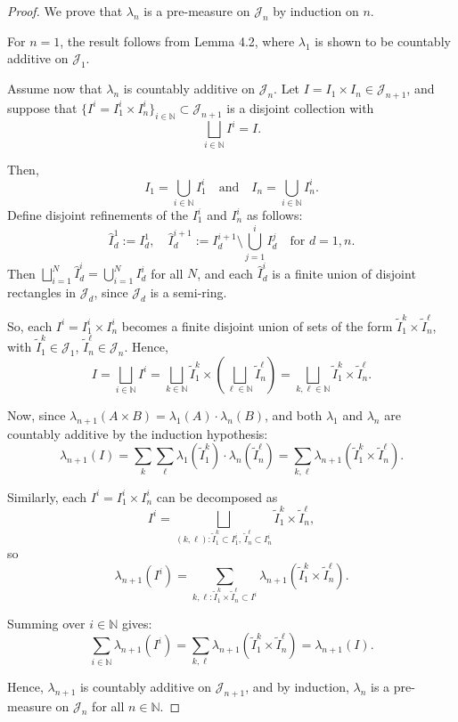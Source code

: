\documentclass[12pt]{article}
\theoremstyle{definition}
\begin{document}
\begin{proof}
We prove that \( \lambda_n \) is a pre-measure on \( \mathcal{J}_n \) by induction on \( n \).

For \( n = 1 \), the result follows from Lemma 4.2, where \( \lambda_1 \) is shown to be countably additive on \( \mathcal{J}_1 \).

Assume now that \( \lambda_n \) is countably additive on \( \mathcal{J}_n \). Let \( I = I_1 \times I_n \in \mathcal{J}_{n+1} \), and suppose that \( \{I^i = I_1^i \times I_n^i\}_{i \in \mathbb{N}} \subset \mathcal{J}_{n+1} \) is a disjoint collection with
\[
\bigsqcup_{i \in \mathbb{N}} I^i = I.
\]

Then,
\[
I_1 = \bigcup_{i \in \mathbb{N}} I_1^i \quad \text{and} \quad I_n = \bigcup_{i \in \mathbb{N}} I_n^i.
\]
Define disjoint refinements of the \( I_1^i \) and \( I_n^i \) as follows:
\[
\widehat{I}_d^1 := I_d^1, \quad \widehat{I}_d^{i+1} := I_d^{i+1} \setminus \bigcup_{j=1}^{i} I_d^j \quad \text{for } d = 1, n.
\]
Then \( \bigsqcup_{i=1}^N \widehat{I}_d^i = \bigcup_{i=1}^N I_d^i \) for all \( N \), and each \( \widehat{I}_d^i \) is a finite union of disjoint rectangles in \( \mathcal{J}_d \), since \( \mathcal{J}_d \) is a semi-ring.

So, each \( I^i = I_1^i \times I_n^i \) becomes a finite disjoint union of sets of the form \( \widetilde{I}_1^k \times \widetilde{I}_n^\ell \), with \( \widetilde{I}_1^k \in \mathcal{J}_1 \), \( \widetilde{I}_n^\ell \in \mathcal{J}_n \). Hence,
\[
I = \bigsqcup_{i \in \mathbb{N}} I^i
= \bigsqcup_{k \in \mathbb{N}} \widetilde{I}_1^k \times \left( \bigsqcup_{\ell \in \mathbb{N}} \widetilde{I}_n^\ell \right)
= \bigsqcup_{k, \ell \in \mathbb{N}} \widetilde{I}_1^k \times \widetilde{I}_n^\ell.
\]

Now, since \( \lambda_{n+1}(A \times B) = \lambda_1(A) \cdot \lambda_n(B) \), and both \( \lambda_1 \) and \( \lambda_n \) are countably additive by the induction hypothesis:
\[
\lambda_{n+1}(I) = \sum_{k} \sum_{\ell} \lambda_1(\widetilde{I}_1^k) \cdot \lambda_n(\widetilde{I}_n^\ell)
= \sum_{k, \ell} \lambda_{n+1}(\widetilde{I}_1^k \times \widetilde{I}_n^\ell).
\]

Similarly, each \( I^i = I_1^i \times I_n^i \) can be decomposed as
\[
I^i = \bigsqcup_{(k, \ell): \widetilde{I}_1^k \subset I_1^i, \, \widetilde{I}_n^\ell \subset I_n^i} \widetilde{I}_1^k \times \widetilde{I}_n^\ell,
\]
so
\[
\lambda_{n+1}(I^i) = \sum_{k, \ell: \widetilde{I}_1^k \times \widetilde{I}_n^\ell \subset I^i} \lambda_{n+1}(\widetilde{I}_1^k \times \widetilde{I}_n^\ell).
\]

Summing over \( i \in \mathbb{N} \) gives:
\[
\sum_{i \in \mathbb{N}} \lambda_{n+1}(I^i)
= \sum_{k, \ell} \lambda_{n+1}(\widetilde{I}_1^k \times \widetilde{I}_n^\ell)
= \lambda_{n+1}(I).
\]

Hence, \( \lambda_{n+1} \) is countably additive on \( \mathcal{J}_{n+1} \), and by induction, \( \lambda_n \) is a pre-measure on \( \mathcal{J}_n \) for all \( n \in \mathbb{N} \).
\end{proof}
\end{document}
